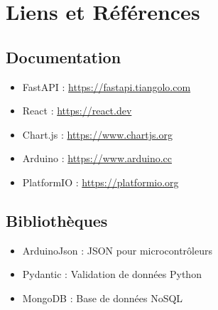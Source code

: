 \documentclass[12pt,french]{report}
\begin{document}
\chapter{Liens et Références}

\section{Documentation}

\begin{itemize}
    \item FastAPI : \url{https://fastapi.tiangolo.com}
    \item React : \url{https://react.dev}
    \item Chart.js : \url{https://www.chartjs.org}
    \item Arduino : \url{https://www.arduino.cc}
    \item PlatformIO : \url{https://platformio.org}
\end{itemize}

\section{Bibliothèques}

\begin{itemize}
    \item ArduinoJson : JSON pour microcontrôleurs
    \item Pydantic : Validation de données Python
    \item MongoDB : Base de données NoSQL
\end{itemize}
\end{document}

